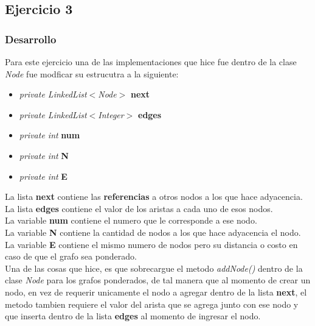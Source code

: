 \documentclass{article}
\begin{document}
		\newpage
			
		\subsection{Ejercicio 3}
		
			\subsubsection{Desarrollo}
			
				Para este ejercicio una de las implementaciones que hice fue dentro de la clase \emph{Node} fue modficar su estrucutra a la siguiente:
				
				\begin{itemize}
					\item \textit{private LinkedList$<$Node$>$} \textbf{next}
					\item \textit{private LinkedList$<$Integer$>$} \textbf{edges}
					\item \textit{private int} \textbf{num}
					\item \textit{private int} \textbf{N}
					\item \textit{private int} \textbf{E}
				\end{itemize}
				
				La lista \textbf{next} contiene las \textbf{referencias} a otros nodos a los que hace adyacencia.\\
				
				La lista \textbf{edges} contiene el valor de los aristas a cada uno de esos nodos.\\
				
				La variable \textbf{num} contiene el numero que le corresponde a ese nodo.\\
				
				La variable \textbf{N} contiene la cantidad de nodos a los que hace adyacencia el nodo.\\
				
				La variable \textbf{E} contiene el mismo numero de nodos pero su distancia o costo en caso de que el grafo sea ponderado.\\
				
				Una de las cosas que hice, es que sobrecargue el metodo \emph{addNode()} dentro de la clase \emph{Node} para los grafos ponderados, de tal manera que al momento de crear un nodo, en vez de requerir unicamente el nodo a agregar dentro de la lista \textbf{next}, el metodo tambien requiere el valor del arista que se agrega junto con ese nodo y que inserta dentro de la lista \textbf{edges} al momento de ingresar el nodo.\\
				
\end{document}
